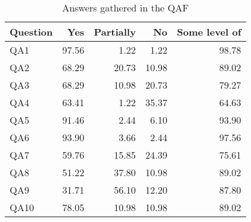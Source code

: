 
\begin{table}[htb!]
	\caption{Answers gathered in the QAF}
	\begin{tabular}{@{}lrrrr@{}}
		\toprule
		Question &   Yes & Partially &    No & Some level of \\
		\midrule
		QA1      & 97.56 &      1.22 &  1.22 &         98.78 \\
		QA2      & 68.29 &     20.73 & 10.98 &         89.02 \\
		QA3      & 68.29 &     10.98 & 20.73 &         79.27 \\
		QA4      & 63.41 &      1.22 & 35.37 &         64.63 \\
		QA5      & 91.46 &      2.44 &  6.10 &         93.90 \\
		QA6      & 93.90 &      3.66 &  2.44 &         97.56 \\
		QA7      & 59.76 &     15.85 & 24.39 &         75.61 \\
		QA8      & 51.22 &     37.80 & 10.98 &         89.02 \\
		QA9      & 31.71 &     56.10 & 12.20 &         87.80 \\
		QA10     & 78.05 &     10.98 & 10.98 &         89.02 \\
		\bottomrule
	\end{tabular}
	\label{tab:answers}
\end{table}
